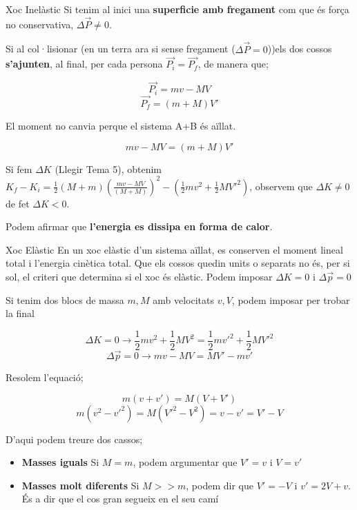 \documentclass[12pt]{article}
\begin{document}
\begin{examplebox}{Xoc Inelàstic}
    Si tenim al inici una \textbf{superficie amb fregament} com que és força no conservativa, $\Delta \vec{P} \neq 0$.

    Si al col·lisionar (en un terra ara si sense fregament ($\Delta \vec{P} = 0$))els dos cossos \textbf{s'ajunten}, al final, per cada persona $\vec{P_i} = \vec{P_f}$, de manera que;

    \[\vec{P_i} = mv - MV\]
    \[\vec{P_f} = (m+M) V'\]

    El moment no canvia perque el sistema A+B és aïllat.

    \[mv - MV = (m+M)V'\]


    Si fem $\Delta K$ (Llegir Tema 5), obtenim $K_f - K_i = \frac{1}{2} (M+m) (\frac{mv-MV}{(M+M)})^2 -(\frac{1}{2}m v^2 + \frac{1}{2} MV'^2)$, observem que $\Delta K \neq 0$ de fet $\Delta K < 0$.

    Podem afirmar que \textbf{l'energia es dissipa en forma de calor}.
\end{examplebox}

\begin{examplebox}{Xoc Elàstic}
    En un xoc elàstic d’un sistema aïllat, es conserven el moment lineal total i l’energia cinètica total. Que els cossos quedin units o separats no és, per si sol, el criteri que determina si el xoc és elàstic. Podem imposar $\Delta K = 0$ i $\Delta \vec{p} = 0$

    Si tenim dos blocs de massa $m, M$ amb velocitats $v, V$, podem imposar per trobar la final

    \[\Delta K = 0 \rightarrow \frac{1}{2}mv^2 + \frac{1}{2}MV^2 = \frac{1}{2}mv'^2 + \frac{1}{2}MV'^2\]
    \[\Delta \vec{p} = 0 \rightarrow mv - MV = MV' - mv'\]

    Resolem l'equació;

    \[m(v+v') = M(V+V')\]
    \[m(v^2 - v'^2) = M(V'^2 -V^2) = v-v' = V'-V\]

    D'aqui podem treure dos cassos;

    \begin{itemize}
        \item \textbf{Masses iguals}
        Si $M = m$, podem argumentar que $V' = v$ i $V = v'$
        
        \item \textbf{Masses molt diferents}
        Si $M >> m$, podem dir que $V' = -V$ i $v' = 2V+v$. És a dir que el cos gran segueix en el seu camí
    
    \end{itemize}

\end{examplebox}
\end{document}

